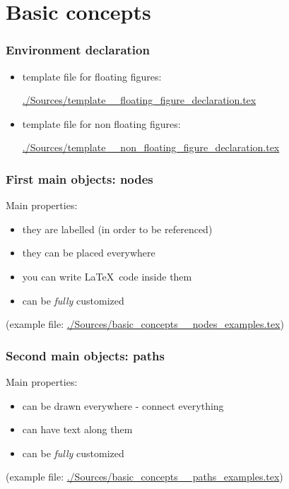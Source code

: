 \section{Basic concepts}



\begin{frame}
	\frametitle{Environment declaration}
	\begin{itemize}
		\item template file for floating figures: \\
			\begin{center}
				\url{./Sources/template__floating_figure_declaration.tex}
			\end{center}
		\vspace{1cm}
		\item template file for non floating figures: \\
			\begin{center}
				\url{./Sources/template__non_floating_figure_declaration.tex}
			\end{center}
	\end{itemize}
\end{frame}









\begin{frame}
	\frametitle{First main objects: nodes}
	Main properties:
	\begin{itemize}
		\item they are labelled (in order to be referenced)
		\item they can be placed everywhere
		\item you can write \LaTeX\ code inside them
		\item can be \emph{fully} customized
	\end{itemize}
	\vspace{1cm}
	(example file: \url{./Sources/basic_concepts__nodes_examples.tex})
	
\end{frame}





\begin{frame}
	\frametitle{Second main objects: paths}
	Main properties:
	\begin{itemize}
		\item can be drawn everywhere - connect everything
		\item can have text along them
		\item can be \emph{fully} customized
	\end{itemize}
	\vspace{1cm}
	(example file: \url{./Sources/basic_concepts__paths_examples.tex})
	
\end{frame}





